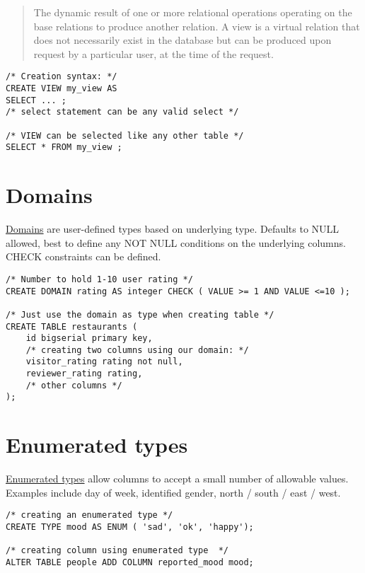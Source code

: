 \begin{quote}
The dynamic result of one or more relational operations operating on the
base relations to produce another relation. A view is a virtual relation
that does not necessarily exist in the database but can be produced upon
request by a particular user, at the time of the request.
\end{quote}

\begin{verbatim}
/* Creation syntax: */
CREATE VIEW my_view AS
SELECT ... ;
/* select statement can be any valid select */

/* VIEW can be selected like any other table */
SELECT * FROM my_view ; 
\end{verbatim}

\section{Domains}\label{sec:domains}

\href{https://www.postgresql.org/docs/13/domains.html}{Domains} are
user-defined types based on underlying type. Defaults to NULL allowed,
best to define any NOT NULL conditions on the underlying columns. CHECK
constraints can be defined.

\begin{verbatim}
/* Number to hold 1-10 user rating */
CREATE DOMAIN rating AS integer CHECK ( VALUE >= 1 AND VALUE <=10 );

/* Just use the domain as type when creating table */
CREATE TABLE restaurants (
    id bigserial primary key,
    /* creating two columns using our domain: */
    visitor_rating rating not null,
    reviewer_rating rating, 
    /* other columns */
);
\end{verbatim}

\section{Enumerated types}\label{sec:enumerated-types}

\href{https://www.postgresql.org/docs/13/datatype-enum.html}{Enumerated
types} allow columns to accept a small number of allowable values.
Examples include day of week, identified gender, north / south / east /
west.

\begin{verbatim}
/* creating an enumerated type */
CREATE TYPE mood AS ENUM ( 'sad', 'ok', 'happy');

/* creating column using enumerated type  */
ALTER TABLE people ADD COLUMN reported_mood mood;
\end{verbatim}


